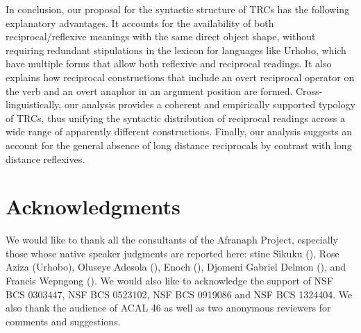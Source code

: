 \documentclass[output=paper]{langsci/langscibook}
\begin{document}
In conclusion, our proposal for the syntactic structure of TRCs has the following explanatory advantages. It accounts for the availability of both reciprocal/reflexive meanings with the same direct object shape, without requiring redundant stipulations in the lexicon for languages like Urhobo, which have multiple forms that allow both reflexive and reciprocal readings. It also explains how reciprocal constructions that include an overt reciprocal operator on the verb and an overt anaphor in an argument position are formed. Cross-linguistically, our analysis provides a coherent and empirically supported typology of TRCs, thus unifying the syntactic distribution of reciprocal readings across a wide range of apparently different constructions. Finally, our analysis suggests an account for the general absence of long distance reciprocals by contrast with long distance reflexives.

\section*{Acknowledgments}

We would like to thank all the consultants of the Afranaph Project, especially those whose native speaker judgments are reported here: stine Sikuku (), Rose Aziza (Urhobo), Oluseye Adesola (), Enoch  (), Djomeni Gabriel Delmon (), and Francis  Wepngong (). We would also like to acknowledge the support of NSF BCS 0303447, NSF BCS 0523102, NSF BCS 0919086 and NSF BCS 1324404. We also thank the audience of ACAL 46 as well as two anonymous reviewers for comments and suggestions.  
\end{document}
